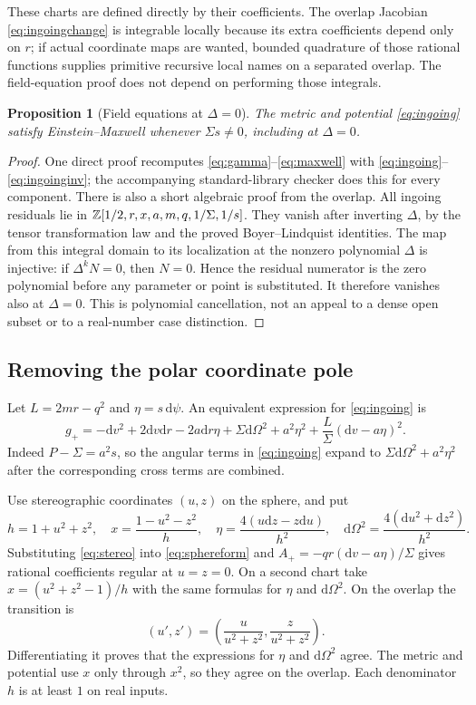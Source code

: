 \documentclass[11pt,a4paper]{article}
\numberwithin{equation}{section}
\newtheorem{proposition}[theorem]{Proposition}
\theoremstyle{definition}\newtheorem{definition}[theorem]{Definition}
\theoremstyle{remark}\newtheorem{remark}[theorem]{Remark}
\newcommand{\dd}{\mathrm{d}}
\begin{document}
These charts are defined directly by their coefficients. The overlap Jacobian \eqref{eq:ingoingchange} is integrable locally because its extra coefficients depend only on $r$; if actual coordinate maps are wanted, bounded quadrature of those rational functions supplies primitive recursive local names on a separated overlap. The field-equation proof does not depend on performing those integrals.

\begin{proposition}[Field equations at $\Delta=0$]\label{prop:regular}
The metric and potential \eqref{eq:ingoing} satisfy Einstein--Maxwell whenever $\Sigma s\ne0$, including at $\Delta=0$.
\end{proposition}
\begin{proof}
One direct proof recomputes \eqref{eq:gamma}--\eqref{eq:maxwell} with \eqref{eq:ingoing}--\eqref{eq:ingoinginv}; the accompanying standard-library checker does this for every component. There is also a short algebraic proof from the overlap. All ingoing residuals lie in
$\mathbb{Z}[1/2,r,x,a,m,q,1/\Sigma,1/s]$. They vanish after inverting $\Delta$, by the tensor transformation law and the proved Boyer--Lindquist identities. The map from this integral domain to its localization at the nonzero polynomial $\Delta$ is injective: if $\Delta^kN=0$, then $N=0$. Hence the residual numerator is the zero polynomial before any parameter or point is substituted. It therefore vanishes also at $\Delta=0$. This is polynomial cancellation, not an appeal to a dense open subset or to a real-number case distinction.
\end{proof}

\subsection{Removing the polar coordinate pole}
Let $L=2mr-q^2$ and $\eta=s\,\dd\psi$. An equivalent expression for \eqref{eq:ingoing} is
\begin{equation}\label{eq:sphereform}
 g_+=-\dd v^2+2\dd v\dd r-2a\dd r\eta
    +\Sigma\dd\Omega^2+a^2\eta^2+\frac L\Sigma(\dd v-a\eta)^2.
\end{equation}
Indeed $P-\Sigma=a^2s$, so the angular terms in \eqref{eq:ingoing} expand to $\Sigma\dd\Omega^2+a^2\eta^2$ after the corresponding cross terms are combined.

Use stereographic coordinates $(u,z)$ on the sphere, and put
\begin{equation}\label{eq:stereo}
 h=1+u^2+z^2,\quad x=\frac{1-u^2-z^2}{h},\quad
 \eta=\frac{4(u\dd z-z\dd u)}{h^2},\quad
 \dd\Omega^2=\frac{4(\dd u^2+\dd z^2)}{h^2}.
\end{equation}
Substituting \eqref{eq:stereo} into \eqref{eq:sphereform} and $A_+=-qr(\dd v-a\eta)/\Sigma$ gives rational coefficients regular at $u=z=0$. On a second chart take $x=(u^2+z^2-1)/h$ with the same formulas for $\eta$ and $\dd\Omega^2$. On the overlap the transition is
\[
 (u',z')=\left(\frac{u}{u^2+z^2},\frac{z}{u^2+z^2}\right).
\]
Differentiating it proves that the expressions for $\eta$ and $\dd\Omega^2$ agree. The metric and potential use $x$ only through $x^2$, so they agree on the overlap. Each denominator $h$ is at least $1$ on real inputs.
\end{document}
